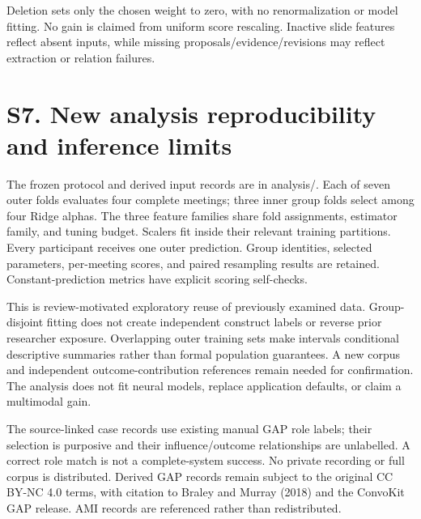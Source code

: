 \documentclass[journal,onecolumn]{IEEEtran}
\begin{document}
Deletion sets only the chosen weight to zero, with no renormalization or model fitting. No gain is claimed from uniform score rescaling. Inactive slide features reflect absent inputs, while missing proposals/evidence/revisions may reflect extraction or relation failures.

\section*{S7. New analysis reproducibility and inference limits}
The frozen protocol and derived input records are in analysis/. Each of seven outer folds evaluates four complete meetings; three inner group folds select among four Ridge alphas. The three feature families share fold assignments, estimator family, and tuning budget. Scalers fit inside their relevant training partitions. Every participant receives one outer prediction. Group identities, selected parameters, per-meeting scores, and paired resampling results are retained. Constant-prediction metrics have explicit scoring self-checks.

This is review-motivated exploratory reuse of previously examined data. Group-disjoint fitting does not create independent construct labels or reverse prior researcher exposure. Overlapping outer training sets make intervals conditional descriptive summaries rather than formal population guarantees. A new corpus and independent outcome-contribution references remain needed for confirmation. The analysis does not fit neural models, replace application defaults, or claim a multimodal gain.

The source-linked case records use existing manual GAP role labels; their selection is purposive and their influence/outcome relationships are unlabelled. A correct role match is not a complete-system success. No private recording or full corpus is distributed. Derived GAP records remain subject to the original CC BY-NC 4.0 terms, with citation to Braley and Murray (2018) and the ConvoKit GAP release. AMI records are referenced rather than redistributed.
\end{document}
